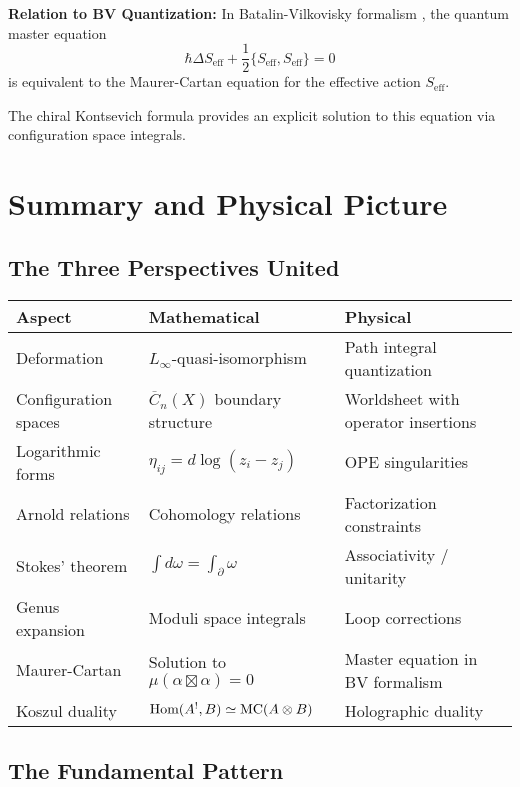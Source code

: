 \textbf{Relation to BV Quantization:} In Batalin-Vilkovisky formalism \cite{CG17}, the quantum master equation
$$\hbar \Delta S_{\text{eff}} + \frac{1}{2}\{S_{\text{eff}}, S_{\text{eff}}\} = 0$$
is equivalent to the Maurer-Cartan equation for the effective action $S_{\text{eff}}$.

The chiral Kontsevich formula provides an explicit solution to this equation via configuration space integrals.

\section{Summary and Physical Picture}
\label{sec:summary-deformation}

\subsection{The Three Perspectives United}

\begin{center}
\begin{tabular}{|p{3cm}|p{4.5cm}|p{4.5cm}|}
\hline
\textbf{Aspect} & \textbf{Mathematical} & \textbf{Physical} \\
\hline
Deformation & $L_\infty$-quasi-isomorphism & Path integral quantization \\
\hline
Configuration spaces & $\overline{C}_n(X)$ boundary structure & Worldsheet with operator insertions \\
\hline
Logarithmic forms & $\eta_{ij} = d\log(z_i - z_j)$ & OPE singularities \\
\hline
Arnold relations & Cohomology relations & Factorization constraints \\
\hline
Stokes' theorem & $\int d\omega = \int_{\partial} \omega$ & Associativity / unitarity \\
\hline
Genus expansion & Moduli space integrals & Loop corrections \\
\hline
Maurer-Cartan & Solution to $\mu(\alpha \boxtimes \alpha) = 0$ & Master equation in BV formalism \\
\hline
Koszul duality & $\text{Hom}(A^!, B) \simeq \text{MC}(A \otimes B)$ & Holographic duality \\
\hline
\end{tabular}
\end{center}

\subsection{The Fundamental Pattern}

